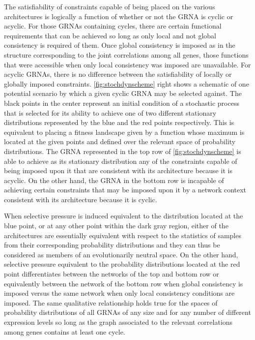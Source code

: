 The satisfiability of constraints capable of being placed on the various architectures is logically a function of whether or not the GRNA is cyclic or acyclic. For those GRNAs containing cycles, there are certain functional requirements that can be achieved so long as only local and not global consistency is required of them. Once global consistency is imposed as in the structure corresponding to the joint correlations among all genes, those functions that were accessible when only local consistency was imposed are unavailable. For acyclic GRNAs, there is no difference between the satisfiability of locally or globally imposed constraints. \ref{fig:stochdynscheme} right shows a schematic of one potential scenario by which a given cyclic GRNA may be selected against. The black points in the center represent an initial condition of a stochastic process that is selected for its ability to achieve one of two different stationary distributions represented by the blue and the red points respectively. This is equivalent to placing a fitness landscape given by a function whose maximum is located at the given points and defined over the relevant space of probability distributions. The GRNA represented in the top row of \ref{fig:stochdynscheme} is able to achieve as its stationary distribution any of the constraints capable of being imposed upon it that are consistent with its architecture because it is acyclic. On the other hand, the GRNA in the bottom row is incapable of achieving certain constraints that may be imposed upon it by a network context consistent with its architecture because it is cyclic.

When selective pressure is induced equivalent to the distribution located at the blue point, or at any other point within the dark gray region, either of the architectures are essentially equivalent with respect to the statistics of samples from their corresponding probability distributions and they can thus be considered as members of an evolutionarily neutral space. On the other hand, selective pressure equivalent to the probability distributions located at the red point differentiates between the networks of the top and bottom row or equivalently between the network of the bottom row when global consistency is imposed versus the same network when only local consistency conditions are imposed. The same qualitative relationship holds true for the spaces of probability distributions of all GRNAs of any size and for any number of different expression levels so long as the graph associated to the relevant correlations among genes contains at least one cycle.


